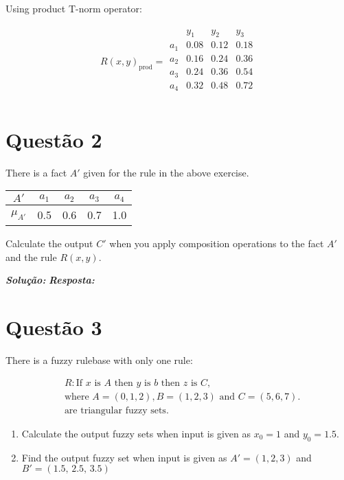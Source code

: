 \documentclass{article}
\begin{document}
Using product T-norm operator:

\begin{gather*}
  R(x, y)_{\text{prod}} =
  \begin{array}{c|ccc}
        & y_1  & y_2  & y_3  \\
    \hline
    a_1 & 0.08 & 0.12 & 0.18 \\
    a_2 & 0.16 & 0.24 & 0.36 \\
    a_3 & 0.24 & 0.36 & 0.54 \\
    a_4 & 0.32 & 0.48 & 0.72 \\
  \end{array}
\end{gather*}




\section*{Questão 2}

There is a fact $A'$ given for the rule in the above exercise.

\begin{table}[H]
  \centering
  \begin{tabular}{ccccc}
    \toprule
    $A'$       & $a_1$ & $a_2$ & $a_3$ & $a_4$ \\
    \midrule
    $\mu_{A'}$ & 0.5   & 0.6   & 0.7   & 1.0   \\
    \bottomrule
  \end{tabular}
\end{table}

Calculate the output $C'$ when you apply composition operations to the fact $A'$ and the rule $R(x, y)$.

\textit{\textbf{Solução:}}
\textit{\textbf{Resposta:}}

\section*{Questão 3}

There is a fuzzy rulebase with only one rule:

\begin{align*}
   & R: \text{If } x \text{ is } A \text{ then } y \text{ is } b \text{ then } z \text { is } C, \\
   & \text{where } A = (0,1,2), B = (1,2,3) \text{ and } C=(5,6,7).                              \\
   & \text{are triangular fuzzy sets.}
\end{align*}

\begin{enumerate}[label=\alph*)]
  \item Calculate the output fuzzy sets when input is given as $x_0=1$ and $y_0=1.5$.
  \item Find the output fuzzy set when input is given as $A'=(1, 2, 3)$ and $B'=(1.5, \, 2.5, \, 3.5)$
\end{enumerate}
\end{document}
